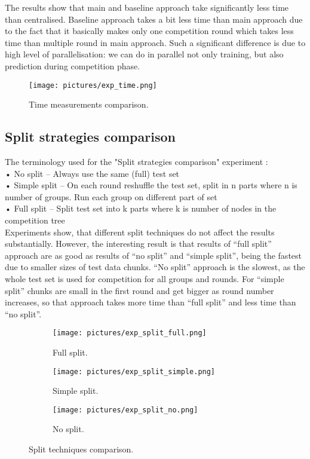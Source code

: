 \documentclass{scrartcl}
\begin{document}
The results show that main and baseline approach take significantly less time than centralised. Baseline approach takes a bit less time than main approach due to the fact that it basically makes only one competition round which takes less time than multiple round in main approach. Such a significant difference is due to high level of parallelisation: we can do in parallel not only training, but also prediction during competition phase.
\begin{figure}[H]
  \begin{center}
  \texttt{[image: pictures/exp\_time.png]}
    \end{center}
  \caption{Time measurements comparison.}
  \label{fig:exp_time}
\end{figure}

\subsection{Split strategies comparison}
The terminology used for the "Split strategies comparison" experiment : \\
•	No split – Always use the same (full) test set \\
•	Simple split – On each round reshuffle the test set, split in n parts where n is number of groups. Run each group on different part of set\\
•	Full split – Split test set into k parts where k is number of nodes in the competition tree\\
Experiments show, that different split techniques do not affect the results substantially.  However, the interesting result is that results of “full split” approach are as good as results of “no split” and “simple split”, being the fastest due to smaller sizes of test data chunks. “No split” approach is the slowest, as the whole test set is used for competition for all groups and rounds. For “simple split” chunks are small in the first round and get bigger as round number increases, so that approach takes more time than “full split” and less time than “no split”.

\begin{figure}[H]
  \centering
  \begin{subfigure}[b]{0.45\linewidth}
    \texttt{[image: pictures/exp\_split\_full.png]}
    \caption{Full split.}
  \end{subfigure}\hfill%
  \begin{subfigure}[b]{0.45\linewidth}
    \texttt{[image: pictures/exp\_split\_simple.png]}
    \caption{Simple split.}
  \end{subfigure}
    \begin{subfigure}[b]{0.45\linewidth}
    \texttt{[image: pictures/exp\_split\_no.png]}
    \caption{No split.}
  \end{subfigure}
  \caption{Split techniques comparison.}
  \label{fig:splits}
\end{figure}
\end{document}

